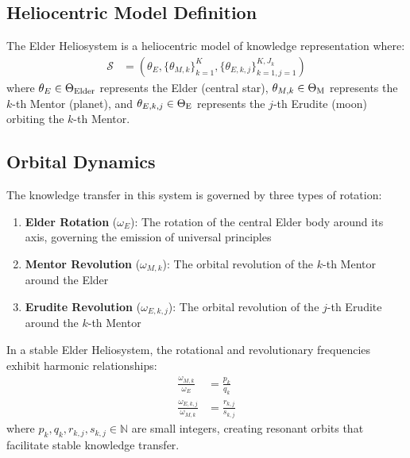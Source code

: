\subsection{Heliocentric Model Definition}

\begin{definition}
The Elder Heliosystem is a heliocentric model of knowledge representation where:
\begin{align}
\mathcal{S} &= (\theta_E, \{\theta_{M,k}\}_{k=1}^K, \{\theta_{E,k,j}\}_{k=1,j=1}^{K,J_k})
\end{align}
where $\theta_E \in \Theta_{\text{Elder}}$ represents the Elder (central star), $\theta_{M,k} \in \Theta_{\text{M}}$ represents the $k$-th Mentor (planet), and $\theta_{E,k,j} \in \Theta_{\text{E}}$ represents the $j$-th Erudite (moon) orbiting the $k$-th Mentor.
\end{definition}

\subsection{Orbital Dynamics}

The knowledge transfer in this system is governed by three types of rotation:

\begin{enumerate}
    \item \textbf{Elder Rotation} ($\omega_E$): The rotation of the central Elder body around its axis, governing the emission of universal principles
    \item \textbf{Mentor Revolution} ($\omega_{M,k}$): The orbital revolution of the $k$-th Mentor around the Elder
    \item \textbf{Erudite Revolution} ($\omega_{E,k,j}$): The orbital revolution of the $j$-th Erudite around the $k$-th Mentor
\end{enumerate}

\begin{theorem}
In a stable Elder Heliosystem, the rotational and revolutionary frequencies exhibit harmonic relationships:
\begin{align}
\frac{\omega_{M,k}}{\omega_E} &= \frac{p_k}{q_k} \\
\frac{\omega_{E,k,j}}{\omega_{M,k}} &= \frac{r_{k,j}}{s_{k,j}}
\end{align}
where $p_k, q_k, r_{k,j}, s_{k,j} \in \mathbb{N}$ are small integers, creating resonant orbits that facilitate stable knowledge transfer.
\end{theorem}

